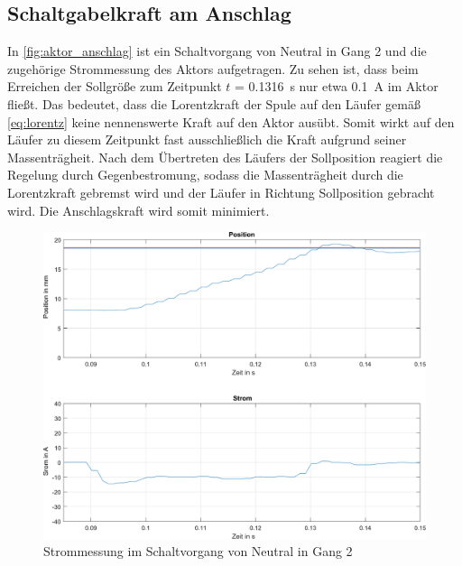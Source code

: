 \subsection{Schaltgabelkraft am Anschlag}\label{schaltgabelkraft}
In \autoref{fig:aktor_anschlag} ist ein Schaltvorgang von Neutral in Gang 2 und die zugehörige Strommessung des Aktors aufgetragen. Zu sehen ist, dass beim Erreichen der Sollgröße zum Zeitpunkt $t$ = \SI{0,1316}{s} nur etwa \SI{0,1}{A} im Aktor fließt. Das bedeutet, dass die Lorentzkraft der Spule auf den Läufer gemäß \autoref{eq:lorentz} keine nennenswerte Kraft auf den Aktor ausübt. Somit wirkt auf den Läufer zu diesem Zeitpunkt fast ausschließlich die Kraft aufgrund seiner Massenträgheit. Nach dem Übertreten des Läufers der Sollposition reagiert die Regelung durch Gegenbestromung, sodass die Massenträgheit durch die Lorentzkraft gebremst wird und der Läufer in Richtung Sollposition gebracht wird. Die Anschlagskraft wird somit minimiert.

\begin{figure} [H]
	\centering
	\includegraphics[width=1\linewidth]{Bilder/aktor_anschlag2.pdf}
	\caption{Strommessung im Schaltvorgang von Neutral in Gang 2}
	\label{fig:aktor_anschlag}
\end{figure}


